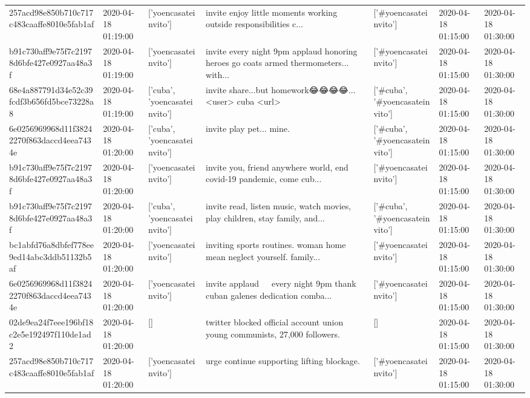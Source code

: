 \begin{tabular}{lllllll}
257acd98e850b710c717c483caaffe8010e5fab1af & 2020-04-18 01:19:00 & ['yoencasateinvito'] & invite enjoy little moments working outside responsibilities c... & ['#yoencasateinvito'] & 2020-04-18 01:15:00 & 2020-04-18 01:30:00 \\
b91c730aff9e75f7c21978d6bfe427e0927aa48a3f & 2020-04-18 01:19:00 & ['yoencasateinvito'] & invite every night 9pm applaud honoring heroes go coats armed thermometers... with... & ['#yoencasateinvito'] & 2020-04-18 01:15:00 & 2020-04-18 01:30:00 \\
68e4a887791d34e52c39fcdf3b656fd5bce73228a8 & 2020-04-18 01:19:00 & ['cuba', 'yoencasateinvito'] & invite share...but homework😂😂😂😂... <user> cuba <url> & ['#cuba', '#yoencasateinvito'] & 2020-04-18 01:15:00 & 2020-04-18 01:30:00 \\
6e0256969968d11f38242270f863daccd4eea7434e & 2020-04-18 01:20:00 & ['cuba', 'yoencasateinvito'] & invite play pet... mine. & ['#cuba', '#yoencasateinvito'] & 2020-04-18 01:15:00 & 2020-04-18 01:30:00 \\
b91c730aff9e75f7c21978d6bfe427e0927aa48a3f & 2020-04-18 01:20:00 & ['yoencasateinvito'] & invite you, friend anywhere world, end covid-19 pandemic, come cub... & ['#yoencasateinvito'] & 2020-04-18 01:15:00 & 2020-04-18 01:30:00 \\
b91c730aff9e75f7c21978d6bfe427e0927aa48a3f & 2020-04-18 01:20:00 & ['cuba', 'yoencasateinvito'] & invite read, listen music, watch movies, play children, stay family, and... & ['#cuba', '#yoencasateinvito'] & 2020-04-18 01:15:00 & 2020-04-18 01:30:00 \\
bc1abfd76a8dbfef778ee9ed14abc3ddb51132b5af & 2020-04-18 01:20:00 & ['yoencasateinvito'] & inviting sports routines. woman home mean neglect yourself. family... & ['#yoencasateinvito'] & 2020-04-18 01:15:00 & 2020-04-18 01:30:00 \\
6e0256969968d11f38242270f863daccd4eea7434e & 2020-04-18 01:20:00 & ['yoencasateinvito'] & invite applaud 👏👏👏 every night 9pm thank cuban galenes dedication comba... & ['#yoencasateinvito'] & 2020-04-18 01:15:00 & 2020-04-18 01:30:00 \\
02de9ea24f7eee196bf18c2e5e192497f110de1ad2 & 2020-04-18 01:20:00 & [] & twitter blocked official account union young communists, 27,000 followers. & [] & 2020-04-18 01:15:00 & 2020-04-18 01:30:00 \\
257acd98e850b710c717c483caaffe8010e5fab1af & 2020-04-18 01:20:00 & ['yoencasateinvito'] & urge continue supporting lifting blockage. & ['#yoencasateinvito'] & 2020-04-18 01:15:00 & 2020-04-18 01:30:00 \\

\end{tabular}
